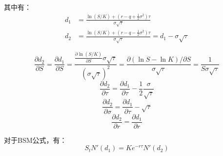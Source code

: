 \documentclass[11pt]{article}
\begin{document}
其中有：
\begin{align*}
    d_1 &= \frac{\ln(S/K) + (r-q+\frac{1}{2} \sigma^2)\tau}{\sigma \sqrt{\tau}} \\
    d_2 &= \frac{\ln(S/K) + (r-q-\frac{1}{2} \sigma^2)\tau}{\sigma \sqrt{\tau}} = d_1 - \sigma \sqrt{\tau}
\end{align*}

\begin{lemma}
    \begin{equation*}
        \frac{\partial d_2}{\partial S} = \frac{\partial d_1}{\partial S} = \frac{\frac{\partial \ln(S/K)}{\partial S} \sigma \sqrt{\tau}}{(\sigma \sqrt{\tau})^2} = \frac{\partial (\ln S - \ln K)/\partial S}{\sigma\sqrt{\tau}} = \frac{1}{S\sigma\sqrt{\tau}}
    \end{equation*}
    \begin{equation*}
        \frac{\partial d_2}{\partial \tau} = \frac{\partial d_1}{\partial \tau} - \frac{1}{2}\frac{\sigma}{\sqrt{\tau}}
    \end{equation*}
    \begin{equation*}
        \frac{\partial d_2}{\partial \sigma} = \frac{\partial d_1}{\partial \tau} - \sqrt{\tau}
    \end{equation*}
    \begin{equation*}
        \frac{\partial d_2}{\partial r} = \frac{\partial d_1}{\partial r}
    \end{equation*}
\end{lemma}

\begin{lemma}
    对于BSM公式，有：
    \begin{equation*}
        S_t N'(d_1) = Ke^{-r\tau} N'(d_2)
    \end{equation*}
\end{lemma}
\end{document}
